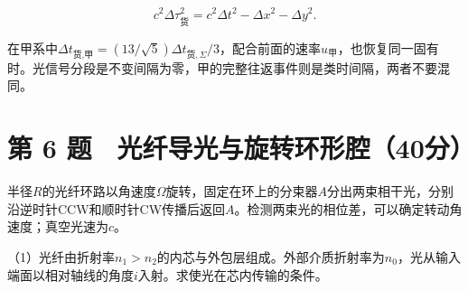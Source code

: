 \documentclass[12pt,a4paper,fontset=fandol]{ctexart}
\begin{document}
\[
c^2\Delta\tau_{\text{货}}^2
=c^2\Delta t^2-\Delta x^2-\Delta y^2.
\]

在甲系中\(\Delta t_{\text{货},\text{甲}}=(13/\sqrt5)\Delta t_{\text{货},\Sigma}/3\)，配合前面的速率\(u_\text{甲}\)，也恢复同一固有时。光信号分段是不变间隔为零，甲的完整往返事件则是类时间隔，两者不要混同。

\clearpage

\section{第 6
题　光纤导光与旋转环形腔（40分）}\label{ux7b2c-6-ux9898-ux5149ux7ea4ux5bfcux5149ux4e0eux65cbux8f6cux73afux5f62ux815440ux5206}

半径\(R\)的光纤环路以角速度\(\Omega\)旋转，固定在环上的分束器\(A\)分出两束相干光，分别沿逆时针CCW和顺时针CW传播后返回\(A\)。检测两束光的相位差，可以确定转动角速度；真空光速为\(c\)。

\begin{center}
\begin{minipage}{\linewidth}
\centering\begingroup{}
\ifdim\wd\diagrambox>.88\linewidth
\sbox{\diagrambox}{\resizebox{.88\linewidth}{!}{\usebox{\diagrambox}}}\fi
\ifdim\ht\diagrambox>.38\textheight
\resizebox{!}{.38\textheight}{\usebox{\diagrambox}}
\else\usebox{\diagrambox}\fi
\par{}\endgroup\end{minipage}\end{center}

（1）光纤由折射率\(n_1>n_2\)的内芯与外包层组成。外部介质折射率为\(n_0\)，光从输入端面以相对轴线的角度\(i\)入射。求使光在芯内传输的条件。
\end{document}
